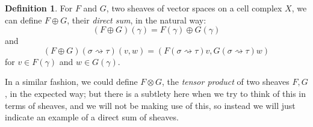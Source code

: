 \documentclass[a4paper]{book}
\theoremstyle{definition}
\theoremstyle{definition}
\newtheorem{definition}{Definition}[section]
\theoremstyle{definition}
\theoremstyle{theorem}
\theoremstyle{definition}
\begin{document}
	\begin{definition}
	For $F$ and $G$, two sheaves of vector spaces on a cell complex $X$, we can define $F \oplus G$, their \textit{direct sum}, in the natural way: 
	\begin{equation*}
	(F \oplus G)(\gamma) = F(\gamma) \oplus G(\gamma) 
	\end{equation*} 
	and 
	\begin{equation*}
	(F \oplus G)(\sigma \rightsquigarrow \tau)(v, w) = (F(\sigma \rightsquigarrow \tau)v, G(\sigma \rightsquigarrow \tau)w) 
	\end{equation*}
	for $v \in F(\gamma)$ and $w \in G(\gamma)$.  
	\end{definition} \noindent 
In a similar fashion, we could define $F \otimes G$, the \textit{tensor product} of two sheaves $F, G$, in the expected way; but there is a subtlety here when we try to think of this in terms of sheaves, and we will not be making use of this, so instead we will just indicate an example of a direct sum of sheaves. 
\end{document}

